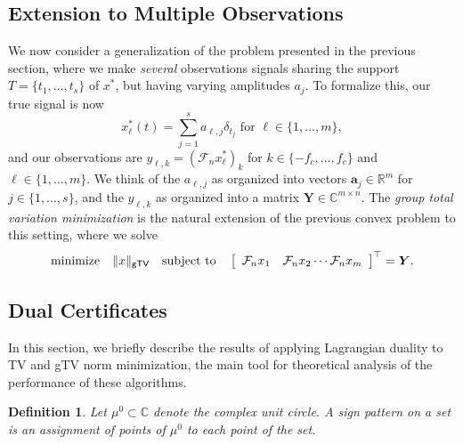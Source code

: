 \documentclass[11pt]{article}
\newcommand{\RR}{\mathbb{R}}
\newcommand{\CC}{\mathbb{C}}
\newcommand{\sF}{\mathcal{F}}
\newcommand{\HS}{\hspace{3.5mm}}
\newcommand{\bY}{\bm Y}
\newcommand{\ba}{\bm a}
\newtheorem{definition}{Definition}
\begin{document}
\subsection{Extension to Multiple Observations}

We now consider a generalization of the problem presented in the previous section, where we make \emph{several} observations signals sharing the support $T = \{t_1, \dots, t_s\}$ of $x^*$, but having varying amplitudes $a_j$.
To formalize this, our true signal is now
\begin{equation}
    x^*_\ell(t) = \sum_{j = 1}^s a_{\ell, j} \delta_{t_j} \text{ for } \ell \in \{1, \dots, m\},
\end{equation}
and our observations are $y_{\ell, k} = (\sF_n x^*_\ell)_{k}$ for $k \in \{-f_c, \dots, f_c\}$ and $\ell \in \{1, \dots, m\}$.
We think of the $a_{\ell, j}$ as organized into vectors $\ba_{j} \in \RR^m$ for $j \in \{1, \dots, s\}$, and the  $y_{\ell, k}$ as organized into a matrix $\bY \in \CC^{m \times n}$.
The \emph{group total variation minimization} is the natural extension of the previous convex problem to this setting, where we solve
\begin{equation}
    \mathrm{minimize} \HS \|x\|_{\mathsf{gTV}} \HS \mathrm{subject\ to} \HS \left[\begin{array}{cccc}\sF_nx_1 & \sF_n x_2 \cdots \sF_n x_m \end{array}\right]^\top = \bY.
\end{equation}

\subsection{Dual Certificates}

In this section, we briefly describe the results of applying Lagrangian duality to \textsf{TV} and \textsf{gTV} norm minimization, the main tool for theoretical analysis of the performance of these algorithms.

\begin{definition}
    Let $\mu^0 \subset \CC$ denote the complex unit circle.
    A \emph{sign pattern} on a set is an assignment of points of $\mu^0$ to each point of the set.
\end{definition}
\end{document}

